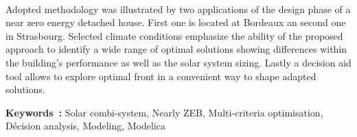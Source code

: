 \paragraph{} %
Adopted methodology was illustrated by two applications of the design phase of
a near zero energy detached house. First one is located at Bordeaux an second one
in Strasbourg. Selected climate conditions emphasize the ability of the proposed
approach to identify a wide range of optimal solutions showing differences within
the building's performance as well as the solar system sizing. Lastly a decision aid tool
allows to explore optimal front in a convenient way to shape adapted solutions.


\vfill
\noindent\textbf{Keywords~:} Solar combi-system, Nearly ZEB, Multi-criteria optimisation, Décision analysis, Modeling, Modelica
